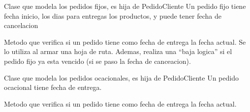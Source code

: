 \documentclass[letterpaper,10pt,english]{sphinxmanual}
\begin{document}
\begin{fulllineitems}
\label{codigo recetas:recetas.models.PedidoFijo}
Clase que modela los pedidos fijos, es hija de PedidoCliente
Un pedido fijo tiene fecha inicio, los dias para entregas los productos, y puede tener fecha de cancelacion

\begin{fulllineitems}
\label{codigo recetas:recetas.models.PedidoFijo.esParaHoy}
Metodo que verifica si un pedido tiene como fecha de entrega la fecha actual.
Se lo utiliza al armar una hoja de ruta.
Ademas, realiza una ``baja logica'' si el pedido fijo ya esta vencido (si se paso la fecha de canceacion).

\end{fulllineitems}


\end{fulllineitems}


\begin{fulllineitems}
\label{codigo recetas:recetas.models.PedidoOcacional}
Clase que modela los pedidos ocacionales, es hija de PedidoCliente
Un pedido ocacional tiene fecha de entrega.

\begin{fulllineitems}
\label{codigo recetas:recetas.models.PedidoOcacional.esParaHoy}
Metodo que verifica si un pedido tiene como fecha de entrega la fecha actual.

\end{fulllineitems}


\end{fulllineitems}


\begin{fulllineitems}
\label{codigo recetas:recetas.models.PedidoProveedor}
\end{fulllineitems}
\end{document}
